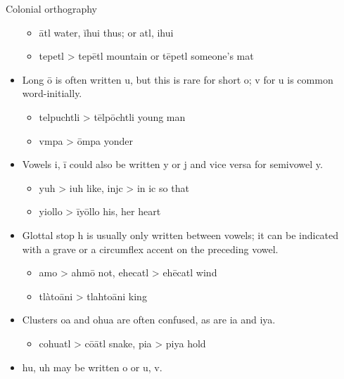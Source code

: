 \documentclass[12pt]{beamer}
\newcommand{\nah}[1]{\textcolor{nahgrn}{#1}}
\newcommand{\trs}[1]{\textcolor{nahblu}{#1}}
\begin{document}
\begin{frame}
\begin{columns}[t]
\begin{column}{.22\linewidth}
\begin{block}{Colonial orthography}
\begin{itemize}
\begin{itemize}
                  \item  \nah{ātl} \trs{water}, \nah{ĭhui} \trs{thus}; or \nah{atl}, \nah{ihui}
                  \item  \nah{tepetl} > \nah{tepētl} \trs{mountain} or \nah{tēpetl} \trs{someone's mat}
                \end{itemize}
          \item  Long \nah{ō} is often written \nah{u}, but this is rare for short \nah{o}; \nah{v} for \nah{u} is common word-initially.
                \begin{itemize}
                  \item \nah{telpuchtli} > \nah{tēlpōchtli} \trs{young man}
                  \item \nah{vmpa} > \nah{ōmpa} \trs{yonder}
                \end{itemize}
          \item Vowels \nah{i}, \nah{ī} could also be written \nah{y} or \nah{j} and vice versa for semivowel \nah{y}.
                \begin{itemize}
                  \item \nah{yuh} > \nah{iuh} \trs{like}, \nah{injc} > \nah{in ic} \trs{so that}
                  \item \nah{yiollo} > \nah{īyōllo} \trs{his, her heart}
                \end{itemize}
          \item Glottal stop \nah{h} is usually only written between vowels; it can be indicated with  a grave or a circumflex accent on the preceding vowel.
                \begin{itemize}
                  \item \nah{amo} > \nah{ahmō} \trs{not}, \nah{ehecatl} > \nah{ehēcatl} \trs{wind}
                  \item \nah{tlàtoāni} > \nah{tlahtoāni} \trs{king}
                \end{itemize}
          \item Clusters \nah{oa} and \nah{ohua} are often confused, as are \nah{ia} and \nah{iya}.
                \begin{itemize}
                  \item \nah{cohuatl} > \nah{cōātl} \trs{snake}, \nah{pia} > \nah{piya} \trs{hold}
                \end{itemize}
          \item \nah{hu, uh} may be written \nah{o} or \nah{u, v}.
                \begin{itemize}

\end{itemize}
\end{itemize}
\end{block}
\end{column}
\end{columns}
\end{frame}
\end{document}
